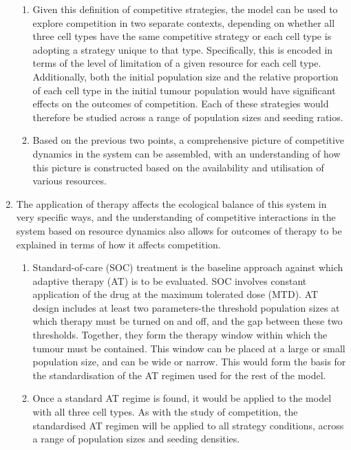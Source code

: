\begin{enumerate}
\begin{enumerate}
    \item Given this definition of competitive strategies, the model can be used to explore competition in two separate contexts, depending on whether all three cell types have the same competitive strategy or each cell type is adopting a strategy unique to that type. Specifically, this is encoded in terms of the level of limitation of a given resource for each cell type. Additionally, both the initial population size and the relative proportion of each cell type in the initial tumour population would have significant effects on the outcomes of competition. Each of these strategies would therefore be studied across a range of population sizes and seeding ratios.
    \item Based on the previous two points, a comprehensive picture of competitive dynamics in the system can be assembled, with an understanding of how this picture is constructed based on the availability and utilisation of various resources.
  \end{enumerate}
  \item The application of therapy affects the ecological balance of this system in very specific ways, and the understanding of competitive interactions in the system based on resource dynamics also allows for outcomes of therapy to be explained in terms of how it affects competition.
  \begin{enumerate}
    \item Standard-of-care (SOC) treatment is the baseline approach against which adaptive therapy (AT) is to be evaluated. SOC involves constant application of the drug at the maximum tolerated dose (MTD). AT design includes at least two parameters-the threshold population sizes at which therapy must be turned on and off, and the gap between these two thresholds. Together, they form the therapy window within which the tumour must be contained. This window can be placed at a large or small population size, and can be wide or narrow. This would form the basis for the standardisation of the AT regimen used for the rest of the model.
    \item Once a standard AT regime is found, it would be applied to the model with all three cell types. As with the study of competition, the standardised AT regimen will be applied to all strategy conditions, across a range of population sizes and seeding densities.
  \end{enumerate}
\end{enumerate}
